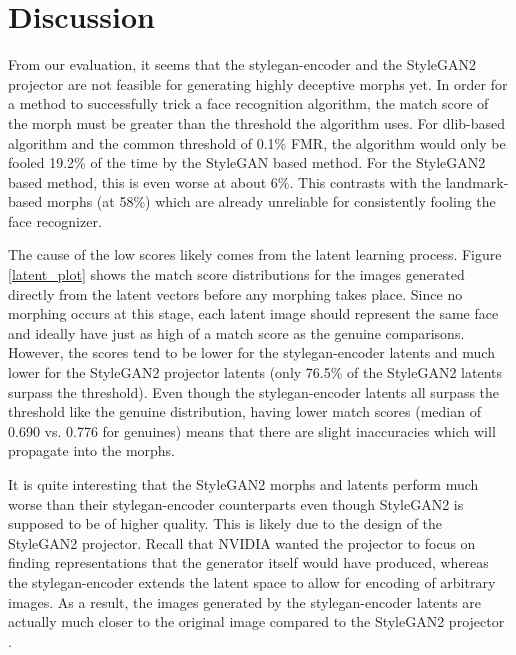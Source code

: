 \documentclass[12pt,twocolumn]{paper}
\begin{document}
\section{Discussion}
\par
From our evaluation, it seems that the stylegan-encoder and the StyleGAN2 projector are not feasible for generating highly deceptive morphs yet. In order for a method to successfully trick a face recognition algorithm, the match score of the morph must be greater than the threshold the algorithm uses. For dlib-based algorithm and the common threshold of 0.1\% FMR, the algorithm would only be fooled 19.2\% of the time by the StyleGAN based method. For the StyleGAN2 based method, this is even worse at about 6\%. This contrasts with the landmark-based morphs (at 58\%) which are already unreliable for consistently fooling the face recognizer.
\par
The cause of the low scores likely comes from the latent learning process. Figure \ref{latent_plot} shows the match score distributions for the images generated directly from the latent vectors before any morphing takes place. Since no morphing occurs at this stage, each latent image should represent the same face and ideally have just as high of a match score as the genuine comparisons. However, the scores tend to be lower for the stylegan-encoder latents and much lower for the StyleGAN2 projector latents (only 76.5\% of the StyleGAN2 latents surpass the threshold). Even though the stylegan-encoder latents all surpass the threshold like the genuine distribution, having lower match scores (median of 0.690 vs. 0.776 for genuines) means that there are slight inaccuracies which will propagate into the morphs.
\par
It is quite interesting that the StyleGAN2 morphs and latents perform much worse than their stylegan-encoder counterparts even though StyleGAN2 is supposed to be of higher quality. This is likely due to the design of the StyleGAN2 projector. Recall that NVIDIA wanted the projector to focus on finding representations that the generator itself would have produced, whereas the stylegan-encoder extends the latent space to allow for encoding of arbitrary images. As a result, the images generated by the stylegan-encoder latents are actually much closer to the original image compared to the StyleGAN2 projector \cite{stylegan2}.
\end{document}
